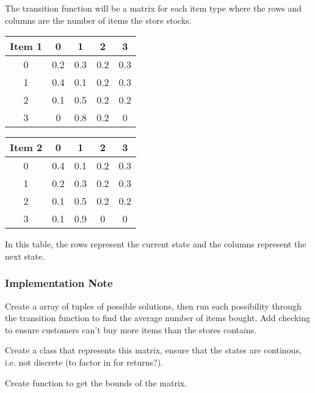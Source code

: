 \documentclass[12pt]{article}
\begin{document}
    The transition function will be a matrix for each item type where the rows and columns are the number of items the store stocks.

    \begin{center}
        \begin{tabular} {|c|c|c|c|c|}
            \hline
            Item 1 & 0 & 1 & 2 & 3 \\
            \hline
            0 & 0.2    & 0.3    & 0.2    & 0.3 \\
            1 & 0.4    & 0.1    & 0.2    & 0.3 \\
            2 & 0.1    & 0.5    & 0.2    & 0.2 \\
            3 & 0      & 0.8    & 0.2    & 0   \\
            \hline
        \end{tabular}
    \end{center}

    \begin{center}
        \begin{tabular} {|c|c|c|c|c|}
            \hline
            Item 2 & 0 & 1 & 2 & 3 \\
            \hline
            0 & 0.4    & 0.1    & 0.2    & 0.3 \\
            1 & 0.2    & 0.3    & 0.2    & 0.3 \\
            2 & 0.1    & 0.5    & 0.2    & 0.2 \\
            3 & 0.1    & 0.9  & 0    & 0       \\
            \hline
        \end{tabular}
    \end{center}

    In this table, the rows represent the current state and the columns represent the next state.

    \subsubsection{Implementation Note}

    Create a array of tuples of possible solutions, then run each possibility through the transition function to find the average number of items bought. 
    Add checking to ensure customers can't buy more items than the stores contains.

    Create a class that represents this matrix, ensure that the states are continous, i.e. not discrete (to factor in for returns?). 
    
    Create function to get the bounds of the matrix.
\end{document}
